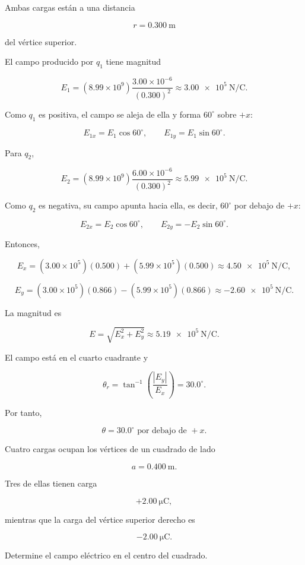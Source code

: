 \begin{explicacion}

Ambas cargas están a una distancia

\[
r=\SI{0.300}{\metre}
\]

del vértice superior.

El campo producido por \(q_1\) tiene magnitud

\[
E_1=(8.99\times10^9)\frac{3.00\times10^{-6}}{(0.300)^2}
\approx\SI{3.00e5}{\newton\per\coulomb}.
\]

Como \(q_1\) es positiva, el campo se aleja de ella y forma \(60^\circ\) sobre \(+x\):

\[
E_{1x}=E_1\cos60^\circ,
\qquad
E_{1y}=E_1\sin60^\circ.
\]

Para \(q_2\),

\[
E_2=(8.99\times10^9)\frac{6.00\times10^{-6}}{(0.300)^2}
\approx\SI{5.99e5}{\newton\per\coulomb}.
\]

Como \(q_2\) es negativa, su campo apunta hacia ella, es decir, \(60^\circ\) por debajo de \(+x\):

\[
E_{2x}=E_2\cos60^\circ,
\qquad
E_{2y}=-E_2\sin60^\circ.
\]

Entonces,

\[
E_x=(3.00\times10^5)(0.500)+(5.99\times10^5)(0.500)
\approx\SI{4.50e5}{\newton\per\coulomb},
\]

\[
E_y=(3.00\times10^5)(0.866)-(5.99\times10^5)(0.866)
\approx-\SI{2.60e5}{\newton\per\coulomb}.
\]

La magnitud es

\[
E=\sqrt{E_x^2+E_y^2}\approx\SI{5.19e5}{\newton\per\coulomb}.
\]

El campo está en el cuarto cuadrante y

\[
\theta_r=\tan^{-1}\left(\frac{|E_y|}{E_x}\right)=30.0^\circ.
\]

Por tanto,

\[
\boxed{\theta=30.0^\circ\text{ por debajo de }+x}.
\]

\end{explicacion}


\begin{ejercicio}

Cuatro cargas ocupan los vértices de un cuadrado de lado

\[
a=\SI{0.400}{\metre}.
\]

Tres de ellas tienen carga

\[
+\SI{2.00}{\micro\coulomb},
\]

mientras que la carga del vértice superior derecho es

\[
-\SI{2.00}{\micro\coulomb}.
\]

Determine el campo eléctrico en el centro del cuadrado.

\end{ejercicio}

